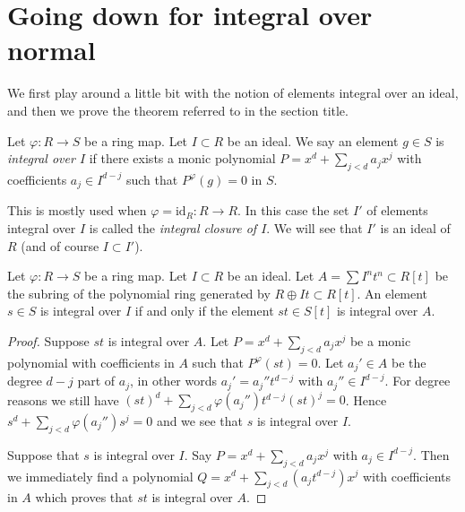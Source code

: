 \section{Going down for integral over normal}
\label{section-going-down-integral-over-normal}

\noindent
We first play around a little bit with the notion of elements
integral over an ideal, and then we prove the theorem referred
to in the section title.

\begin{definition}
\label{definition-integral-over-ideal}
Let $\varphi : R \to S$ be a ring map.
Let $I \subset R$ be an ideal.
We say an element $g \in S$ is
{\it integral over $I$} if
there exists a monic
polynomial $P = x^d + \sum_{j < d} a_j x^j$
with coefficients $a_j \in I^{d-j}$ such
that $P^\varphi(g) = 0$ in $S$.
\end{definition}

\noindent
This is mostly used when $\varphi = \text{id}_R : R \to R$.
In this case the set $I'$ of elements integral over $I$ is called
the {\it integral closure of $I$}. We will see that $I'$ is
an ideal of $R$ (and of course $I \subset I'$).

\begin{lemma}
\label{lemma-characterize-integral-ideal}
Let $\varphi : R \to S$ be a ring map.
Let $I \subset R$ be an ideal.
Let $A = \sum I^nt^n \subset R[t]$ be the
subring of the polynomial ring
generated by $R \oplus It \subset R[t]$.
An element $s \in S$ is integral over $I$ if
and only if the element $st \in S[t]$
is integral over $A$.
\end{lemma}

\begin{proof}
Suppose $st$ is integral over $A$.
Let $P = x^d + \sum_{j < d} a_j x^j$
be a monic polynomial with coefficients in $A$
such that $P^\varphi(st) = 0$. Let $a_j' \in A$
be the degree $d-j$ part of $a_j$, in other
words $a_j' = a_j'' t^{d-j}$ with $a_j'' \in I^{d-j}$.
For degree reasons we still have
$(st)^d + \sum_{j < d} \varphi(a_j'') t^{d-j} (st)^j = 0$.
Hence $s^d + \sum_{j < d} \varphi(a_j'') s^j = 0$
and we see that $s$ is integral over $I$.

\medskip\noindent
Suppose that $s$ is integral over $I$.
Say $P = x^d + \sum_{j < d} a_j x^j$
with $a_j \in I^{d-j}$. Then we immediately find a
polynomial $Q = x^d + \sum_{j < d} (a_j t^{d-j}) x^j$
with coefficients in $A$ which proves that
$st$ is integral over $A$.
\end{proof}


